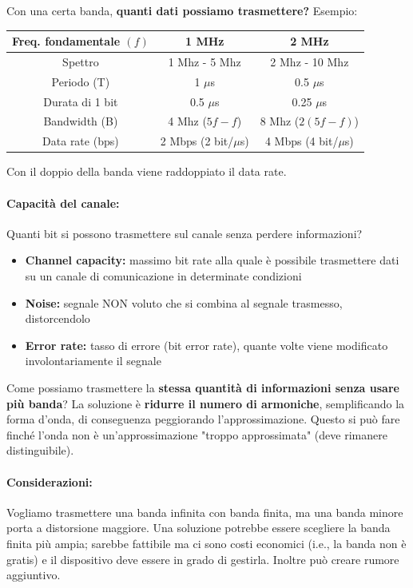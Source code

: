 Con una certa banda, \textbf{quanti dati possiamo trasmettere?} Esempio: 
\begin{center}
	\begin{tabular}{| c | c | c |}
		\hline
		Freq. fondamentale $(f)$ & 1 MHz & 2 MHz \\
		\hline
		Spettro & 1 Mhz - 5 Mhz & 2 Mhz - 10 Mhz \\
		\hline
		Periodo (T) & 1 $\mu$s & 0.5 $\mu$s \\
		\hline 
		Durata di 1 bit & 0.5 $\mu$s & 0.25 $\mu$s \\
		\hline
		Bandwidth (B) & 4 Mhz ($5f - f$) & 8 Mhz ($2(5f - f)$) \\
		\hline
		Data rate (bps) & 2 Mbps (2 bit/$\mu$s) & 4 Mbps (4 bit/$\mu$s) \\ 
		\hline
	\end{tabular}
\end{center}
Con il doppio della banda viene raddoppiato il data rate.

\paragraph{Capacità del canale:} Quanti bit si possono trasmettere sul canale senza perdere informazioni?
\begin{itemize}
	\item \textbf{Channel capacity:} massimo bit rate alla quale è possibile trasmettere dati su un canale di comunicazione in determinate condizioni

	\item \textbf{Noise:} segnale NON voluto che si combina al segnale trasmesso, distorcendolo

	\item \textbf{Error rate:} tasso di errore (bit error rate), quante volte viene modificato involontariamente il segnale
\end{itemize}

Come possiamo trasmettere la \textbf{stessa quantità di informazioni senza usare più banda}? La soluzione è \textbf{ridurre il numero di armoniche}, semplificando la forma d'onda, di conseguenza peggiorando l'approssimazione. Questo si può fare finché l'onda non è un'approssimazione "troppo approssimata" (deve rimanere distinguibile).

\paragraph{Considerazioni:} Vogliamo trasmettere una banda infinita con banda finita, ma una banda minore porta a distorsione maggiore. Una soluzione potrebbe essere scegliere la banda finita più ampia; sarebbe fattibile ma ci sono costi economici (i.e., la banda non è gratis) e il dispositivo deve essere in grado di gestirla. Inoltre può creare rumore aggiuntivo.

